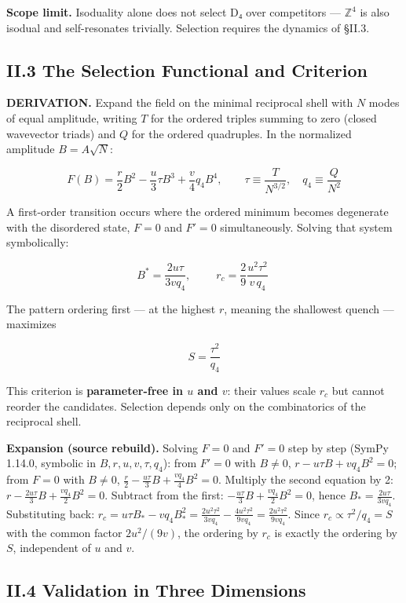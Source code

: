 \documentclass[a4paper,11pt]{article}
\newcommand{\expansion}[1]{\par\smallskip\noindent\textbf{Expansion (source rebuild).} #1\par\smallskip}
\begin{document}
\textbf{Scope limit.} Isoduality alone does not select D₄ over competitors — $\mathbb{Z}^4$ is also isodual and self-resonates trivially. Selection requires the dynamics of §II.3.

\subsection*{II.3 The Selection Functional and Criterion}

\textbf{DERIVATION.} Expand the field on the minimal reciprocal shell with $N$ modes of equal amplitude, writing $T$ for the ordered triples summing to zero (closed wavevector triads) and $Q$ for the ordered quadruples. In the normalized amplitude $B=A\sqrt N$:

\[F(B)=\frac r2B^2-\frac u3\tau B^3+\frac v4q_4B^4,\qquad \tau\equiv\frac{T}{N^{3/2}},\quad q_4\equiv\frac{Q}{N^2}\]

A first-order transition occurs where the ordered minimum becomes degenerate with the disordered state, $F=0$ and $F'=0$ simultaneously. Solving that system symbolically:

\[B^{*}=\frac{2u\tau}{3vq_4},\qquad \boxed{\;r_c=\frac29\frac{u^2\tau^2}{v\,q_4}\;}\]

The pattern ordering first — at the highest $r$, meaning the shallowest quench — maximizes

\[S=\frac{\tau^2}{q_4}\]

This criterion is \textbf{parameter-free in $u$ and $v$}: their values scale $r_c$ but cannot reorder the candidates. Selection depends only on the combinatorics of the reciprocal shell.


\expansion{Solving $F = 0$ and $F' = 0$ step by step (SymPy 1.14.0, symbolic in $B, r, u, v, \tau, q_4$): from $F' = 0$ with $B \neq 0$, $r - u\tau B + vq_4 B^2 = 0$; from $F = 0$ with $B \neq 0$, $\tfrac{r}{2} - \tfrac{u\tau}{3}B + \tfrac{vq_4}{4}B^2 = 0$. Multiply the second equation by 2: $r - \tfrac{2u\tau}{3}B + \tfrac{vq_4}{2}B^2 = 0$. Subtract from the first: $-\tfrac{u\tau}{3}B + \tfrac{vq_4}{2}B^2 = 0$, hence $B_* = \tfrac{2u\tau}{3vq_4}$. Substituting back: $r_c = u\tau B_* - vq_4 B_*^2 = \tfrac{2u^2\tau^2}{3vq_4} - \tfrac{4u^2\tau^2}{9vq_4} = \tfrac{2u^2\tau^2}{9vq_4}$. Since $r_c \propto \tau^2/q_4 = S$ with the common factor $2u^2/(9v)$, the ordering by $r_c$ is exactly the ordering by $S$, independent of $u$ and $v$.}
\subsection*{II.4 Validation in Three Dimensions}
\end{document}
